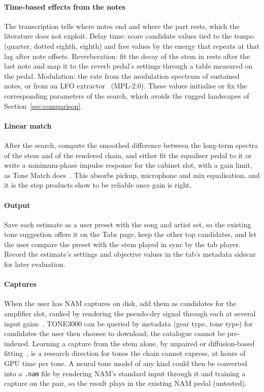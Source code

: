 \paragraph{Time-based effects from the notes} The transcription tells where
notes end and where the part rests, which the literature does not exploit. Delay
time: score candidate values tied to the tempo (quarter, dotted eighth,
eighth) and free values by the energy that repeats at that lag after note
offsets. Reverberation: fit the decay of the stem in rests after the last
note and map it to the reverb pedal's settings through a table measured on the
pedal. Modulation: the rate from the modulation spectrum of sustained notes,
or from an LFO extractor~\cite{mitcheltree2023modulation} (MPL-2.0). These
values initialise or fix the corresponding parameters of the search, which
avoids the rugged landscapes of Section~\ref{sec:comparison}.

\paragraph{Linear match} After the search, compute the smoothed difference
between the long-term spectra of the stem and of the rendered chain, and
either fit the equaliser pedal to it or write a minimum-phase impulse response
for the cabinet slot, with a gain limit, as Tone Match
does~\cite{fractalndtonematch}. This absorbs pickup, microphone and mix
equalisation, and it is the step products show to be reliable once gain is
right.

\paragraph{Output} Save each estimate as a user preset with the song and artist
set, so the existing tone suggestion offers it on the Tabs page, keep the
other top candidates, and let the user compare the preset with the stem played
in sync by the tab player. Record the estimate's settings and objective values
in the tab's metadata sidecar for later evaluation.

\paragraph{Captures} When the user has NAM captures on disk, add them as
candidates for the amplifier slot, ranked by rendering the pseudo-dry signal
through each at several input gains~\cite{sd4562026nameqmatch}. TONE3000 can be
queried by metadata (gear type, tone type) for candidates the user then
chooses to download; the catalogue cannot be pre-indexed. Learning a capture
from the stem alone, by unpaired or diffusion-based
fitting~\cite{wright2023adversarial,moliner2025unsupervised}, is a research
direction for tones the chain cannot express, at hours of GPU time per tone.
A neural tone model of any kind could then be converted into a \texttt{.nam}
file by rendering NAM's standard input through it and training a capture on the
pair, so the result plays in the existing NAM pedal (untested).

